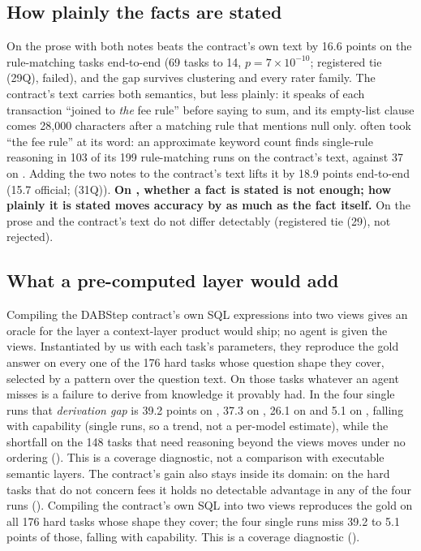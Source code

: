 \subsection{How plainly the facts are stated}
\label{sec:plain}

On \mQwen{} the prose with both notes beats the contract's own text by
16.6 points on the rule-matching tasks end-to-end (69 tasks to 14,
$p{=}7{\times}10^{-10}$; registered tie (29Q), failed), and the gap survives
clustering and every rater family. The contract's text carries both
semantics, but less plainly: it speaks of each transaction ``joined to
\emph{the} fee rule'' before saying to sum, and its empty-list clause
comes 28{,}000 characters after a matching rule that mentions null only.
\mQwen{} often took ``the fee rule'' at its word: an approximate keyword
count finds single-rule reasoning in 103 of its 199 rule-matching runs on
the contract's text, against 37 on \mLuna{}. Adding the two notes to the
contract's text lifts it by 18.9 points end-to-end (15.7 official; (31Q)).
\textbf{On \mQwen{}, whether a fact is stated is not enough; how plainly
it is stated moves accuracy by as much as the fact itself.} On \mLuna{}
the prose and the contract's text do not differ detectably (registered
tie (29), not rejected).

\subsection{What a pre-computed layer would add}
\label{sec:ceiling}

\ifextended
Compiling the DABStep contract's own SQL expressions into two views gives
an oracle for the layer a context-layer product would ship; no agent is
given the views. Instantiated by us with each task's parameters, they
reproduce the gold answer on every one of the 176 hard tasks whose
question shape they cover, selected by a pattern over the question text.
On those tasks whatever an agent misses is a failure to derive from
knowledge it provably had. In the four single runs that \emph{derivation
gap} is 39.2 points on \mGLM{}, 37.3 on \mDS{}, 26.1 on \mSON{} and 5.1 on
\mGPT{}, falling with capability (single runs, so a trend, not a
per-model estimate), while
the shortfall on the 148 tasks that need reasoning beyond the views moves
under no ordering (). This is a coverage diagnostic,
not a comparison with executable semantic layers. The contract's gain also
stays inside its domain: on the hard tasks that do not concern fees it
holds no detectable advantage in any of the four runs
().
\else
Compiling the contract's own SQL into two views reproduces the gold on all
176 hard tasks whose shape they cover; the four single runs miss 39.2 to
5.1 points of those, falling with capability. This is a coverage
diagnostic ().
\fi
